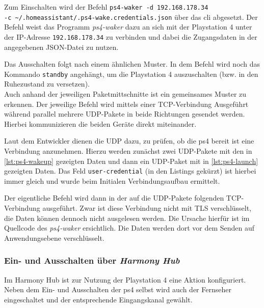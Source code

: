 Zum Einschalten wird der Befehl \texttt{ps4-waker -d 192.168.178.34 \\ -c \textasciitilde{}/.homeassistant/.ps4-wake.credentials.json} über das \ac{cli} abgesetzt.
Der Befehl weist das Programm \textit{ps4-waker} dazu an sich mit der Playstation 4 unter der IP-Adresse \texttt{192.168.178.34} zu verbinden und dabei die Zugangsdaten in der angegebenen JSON-Datei zu nutzen.

Das Ausschalten folgt nach einem ähnlichen Muster.
In dem Befehl wird noch das Kommando \texttt{standby} angehängt,
um die Playstation 4 auszuschalten (bzw. in den Ruhezustand zu versetzen). \\

Auch anhand der jeweiligen Paketmittschnitte ist ein gemeinsames Muster zu erkennen.
Der jeweilige Befehl wird mittels einer TCP-Verbindung Ausgeführt
während parallel mehrere UDP-Pakete in beide Richtungen gesendet werden.
Hierbei kommunizieren die beiden Geräte direkt miteinander.

Laut dem Entwickler dienen die UDP dazu, zu prüfen, ob die \ac{ps4} bereit ist eine Verbindung anzunehmen.
Hierzu werden zunächst zwei UDP-Pakete mit den in \autoref{lst:ps4-wakeup} gezeigten Daten
und dann ein UDP-Paket mit in \autoref{lst:ps4-launch} gezeigten Daten.
Das Feld \texttt{user-credential} (in den Listings gekürzt) ist hierbei immer gleich
und wurde beim Initialen Verbindungsaufbau ermittelt.





Der eigentliche Befehl wird dann in der auf die UDP-Pakete folgenden TCP-Verbindung ausgeführt.
Zwar ist diese Verbindung nicht mit TLS verschlüsselt, die Daten können dennoch nicht ausgelesen werden.
Die Ursache hierfür ist im Quellcode des \textit{ps4-waker} ersichtlich.
Die Daten werden dort vor dem Senden auf Anwendungsebene verschlüsselt.

\subsubsection{Ein- und Ausschalten über \textit{Harmony Hub}}
Im Harmony Hub ist zur Nutzung der Playstation 4 eine Aktion konfiguriert.
Neben dem Ein- und Ausschalten der \ac{ps4} selbst wird auch der Fernseher eingeschaltet und der entsprechende Eingangskanal gewählt.

